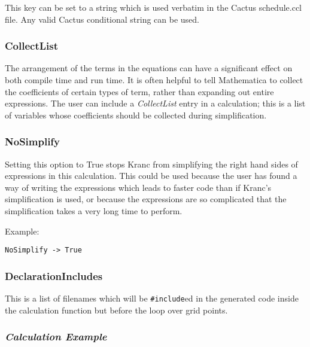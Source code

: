 \documentclass{report}
\begin{document}
This key can be set to a string which is used verbatim in the Cactus
schedule.ccl file.  Any valid Cactus conditional string can be used.

\subsubsection{CollectList}

The arrangement of the terms in the equations can have a significant
effect on both compile time and run time.  It is often helpful to tell
Mathematica to collect the coefficients of certain types of term,
rather than expanding out entire expressions.  The user can include a
{\em CollectList} entry in a calculation; this is a list of variables
whose coefficients should be collected during simplification.

\subsubsection{NoSimplify}

Setting this option to True stops Kranc from simplifying the right
hand sides of expressions in this calculation.  This could be used
because the user has found a way of writing the expressions which
leads to faster code than if Kranc's simplification is used, or
because the expressions are so complicated that the simplification
takes a very long time to perform.

Example:

\begin{center}
\begin{minipage}{0.8 \textwidth}
\begin{verbatim}
NoSimplify -> True
\end{verbatim}
\end{minipage}
\end{center}

\subsubsection{DeclarationIncludes}

This is a list of filenames which will be \verb|#include|ed in the
generated code inside the calculation function but before the loop
over grid points.

\subsubsection{{\it Calculation Example}}
\end{document}
